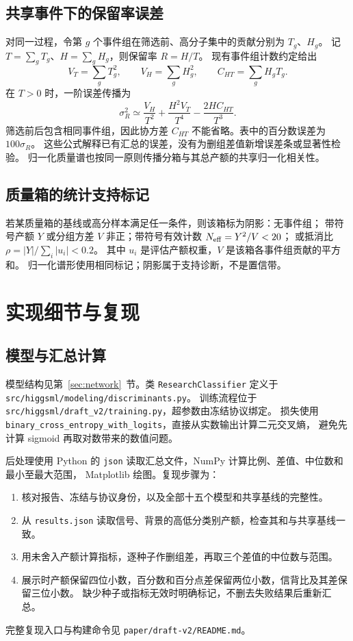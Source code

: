 \documentclass[11pt,a4paper,fontset=fandol,scheme=plain]{ctexart}
\begin{document}
\subsection{共享事件下的保留率误差}
对同一过程，令第 $g$ 个事件组在筛选前、高分子集中的贡献分别为 $T_g$、$H_g$。
记 $T=\sum_g T_g$、$H=\sum_g H_g$，则保留率 $R=H/T$。
现有事件组计数约定给出
\[
 V_T=\sum_g T_g^2,\qquad V_H=\sum_g H_g^2,\qquad C_{HT}=\sum_g H_gT_g.
\]
在 $T>0$ 时，一阶误差传播为
\[
 \sigma_R^2\simeq\frac{V_H}{T^2}+\frac{H^2V_T}{T^4}-\frac{2H C_{HT}}{T^3}.
\]
筛选前后包含相同事件组，因此协方差 $C_{HT}$ 不能省略。表中的百分数误差为 $100\sigma_R$。
这些公式解释已有汇总的误差，没有为删组差值新增误差条或显著性检验。
归一化质量谱也按同一原则传播分箱与其总产额的共享归一化相关性。

\subsection{质量箱的统计支持标记}
若某质量箱的基线或高分样本满足任一条件，则该箱标为阴影：无事件组；
带符号产额 $Y$ 或分组方差 $V$ 非正；带符号有效计数 $N_{\rm eff}=Y^2/V<20$；
或抵消比 $\rho=|Y|/\sum_i|u_i|<0.2$。
其中 $u_i$ 是评估产额权重，$V$ 是该箱各事件组贡献的平方和。
归一化谱形使用相同标记；阴影属于支持诊断，不是置信带。

\section{实现细节与复现}\label{app:network}

\subsection{模型与汇总计算}
模型结构见第~\ref{sec:network}~节。类 \texttt{ResearchClassifier} 定义于
\nolinkurl{src/higgsml/modeling/discriminants.py}。
训练流程位于 \nolinkurl{src/higgsml/draft_v2/training.py}，超参数由冻结协议绑定。
损失使用 \texttt{binary\_cross\_entropy\_with\_logits}，直接从实数输出计算二元交叉熵，
避免先计算 sigmoid 再取对数带来的数值问题。

后处理使用 Python 的 \texttt{json} 读取汇总文件，NumPy 计算比例、差值、中位数和最小至最大范围，
Matplotlib 绘图。复现步骤为：
\begin{enumerate}[leftmargin=1.7em,itemsep=2pt]
\item 核对报告、冻结与协议身份，以及全部十五个模型和共享基线的完整性。
\item 从 \texttt{results.json} 读取信号、背景的高低分类别产额，检查其和与共享基线一致。
\item 用未舍入产额计算指标，逐种子作删组差，再取三个差值的中位数与范围。
\item 展示时产额保留四位小数，百分数和百分点差保留两位小数，信背比及其差保留三位小数。
缺少种子或指标无效时明确标记，不删去失败结果后重新汇总。
\end{enumerate}
完整复现入口与构建命令见 \nolinkurl{paper/draft-v2/README.md}。
\end{document}
